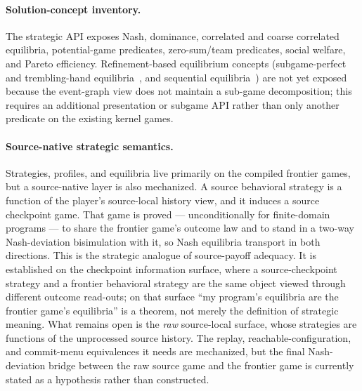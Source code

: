 \paragraph{Solution-concept inventory.}  The strategic API exposes
Nash, dominance, correlated and coarse correlated equilibria,
potential-game predicates, zero-sum/team predicates, social welfare,
and Pareto efficiency.  Refinement-based equilibrium concepts
(subgame-perfect and trembling-hand equilibria~\citep{Selten1975},
and sequential equilibria~\citep{KrepsWilson1982}) are not yet exposed
because the event-graph view does not maintain a sub-game decomposition;
this requires an additional presentation or subgame API rather than
only another predicate on the existing kernel games.

\paragraph{Source-native strategic semantics.}  Strategies, profiles, and
equilibria live primarily on the compiled frontier games, but a source-native
layer is also mechanized.  A source behavioral strategy is a function of the
player's source-local history view, and it induces a source checkpoint game.
That game is proved --- unconditionally for finite-domain programs --- to share
the frontier game's outcome law and to stand in a two-way Nash-deviation
bisimulation with it, so Nash equilibria transport in both directions.  This is
the strategic analogue of source-payoff adequacy.  It is established on the
checkpoint information surface, where a source-checkpoint strategy and a
frontier behavioral strategy are the same object viewed through different
outcome read-outs; on that surface ``my program's equilibria are the frontier
game's equilibria'' is a theorem, not merely the definition of strategic
meaning.  What remains open is the \emph{raw} source-local surface, whose
strategies are functions of the unprocessed source history.  The replay,
reachable-configuration, and commit-menu equivalences it needs are mechanized,
but the final Nash-deviation bridge between the raw source game and the frontier
game is currently stated as a hypothesis rather than constructed.


